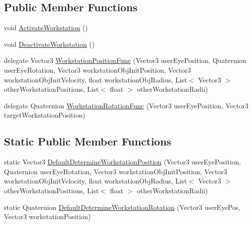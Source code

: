 \subsection*{Public Member Functions}
\begin{DoxyCompactItemize}
\item 
void \mbox{\hyperlink{class_leap_1_1_unity_1_1_examples_1_1_workstation_behaviour_example_a03eb8612fb58f2bf1b79798ebe7a443c}{Activate\+Workstation}} ()
\item 
void \mbox{\hyperlink{class_leap_1_1_unity_1_1_examples_1_1_workstation_behaviour_example_ada103d493d83340b94fbfaf377ff91ee}{Deactivate\+Workstation}} ()
\item 
delegate Vector3 \mbox{\hyperlink{class_leap_1_1_unity_1_1_examples_1_1_workstation_behaviour_example_aa1eb03a23e58150cbb75aee152bb4d33}{Workstation\+Position\+Func}} (Vector3 user\+Eye\+Position, Quaternion user\+Eye\+Rotation, Vector3 workstation\+Obj\+Init\+Position, Vector3 workstation\+Obj\+Init\+Velocity, float workstation\+Obj\+Radius, List$<$ Vector3 $>$ other\+Workstation\+Positions, List$<$ float $>$ other\+Workstation\+Radii)
\item 
delegate Quaternion \mbox{\hyperlink{class_leap_1_1_unity_1_1_examples_1_1_workstation_behaviour_example_a96412e8fc922be4561a1017293783c9a}{Workstation\+Rotation\+Func}} (Vector3 user\+Eye\+Position, Vector3 target\+Workstation\+Position)
\end{DoxyCompactItemize}
\subsection*{Static Public Member Functions}
\begin{DoxyCompactItemize}
\item 
static Vector3 \mbox{\hyperlink{class_leap_1_1_unity_1_1_examples_1_1_workstation_behaviour_example_a45e1d9a2aff57e76f3f41de59aa40a35}{Default\+Determine\+Workstation\+Position}} (Vector3 user\+Eye\+Position, Quaternion user\+Eye\+Rotation, Vector3 workstation\+Obj\+Init\+Position, Vector3 workstation\+Obj\+Init\+Velocity, float workstation\+Obj\+Radius, List$<$ Vector3 $>$ other\+Workstation\+Positions, List$<$ float $>$ other\+Workstation\+Radii)
\item 
static Quaternion \mbox{\hyperlink{class_leap_1_1_unity_1_1_examples_1_1_workstation_behaviour_example_a608204dd046521635b6b3fa83b63d734}{Default\+Determine\+Workstation\+Rotation}} (Vector3 user\+Eye\+Pos, Vector3 workstation\+Position)
\end{DoxyCompactItemize}
